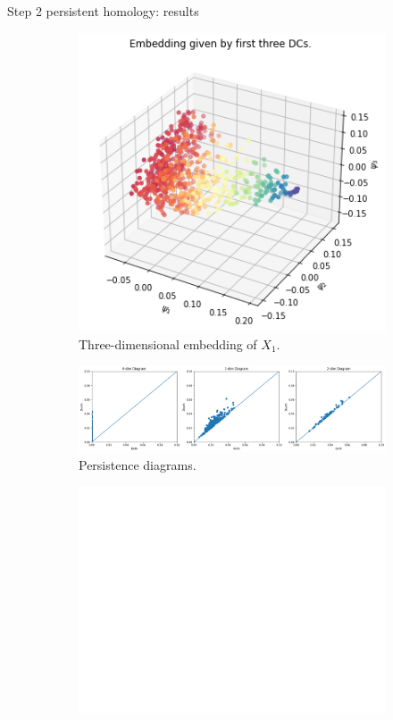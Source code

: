 \documentclass[xcolor={dvipsnames,svgnames}]{beamer}
\begin{document}
\begin{frame}{Step 2 persistent homology: results}
\begin{figure}[H]
\centering
\begin{subfigure}[b]{0.2\textwidth}
    \includegraphics[width=\textwidth]{figures/X1_embedding.png}
    \caption{Three-dimensional embedding of $X_1$.}
\end{subfigure}
\hfill
\begin{subfigure}[b]{0.75\textwidth}
    \includegraphics[width=\textwidth]{figures/X1_H0.png}
    \caption{Persistence diagrams.}
\end{subfigure}
\begin{subfigure}[b]{0.25\textwidth}
\includegraphics[width=\textwidth]{figures/white.png} 

\end{subfigure}
\end{figure}
\end{frame}
\end{document}
